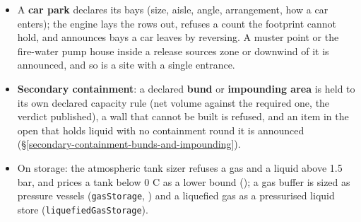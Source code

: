 \documentclass[11pt,a4paper]{article}
\begin{document}
\begin{itemize}
  Each road is carried on from its end to its gate\textquotesingle s
  opening in the fence.
\item
  A \textbf{car park} declares its bays (size, aisle, angle, arrangement,
  how a car enters); the engine lays the rows out, refuses a count the
  footprint cannot hold, and announces bays a car leaves by reversing.
  A muster point or the fire-water pump house inside a release
  source\textquotesingle s zone or downwind of it is announced, and so is
  a site with a single entrance.
\item
  \textbf{Secondary containment}: a declared \textbf{bund} or
  \textbf{impounding area} is held to its own declared capacity rule
  (net volume against the required one, the verdict published), a wall
  that cannot be built is refused, and an item in the open that holds
  liquid with no containment round it is announced
  (\S\ref{secondary-containment-bunds-and-impounding}).
\item
  On storage: the atmospheric tank sizer refuses a gas and a liquid above
  1.5 bar, and prices a tank below 0 \textdegree{}C as a lower bound
  (); a gas buffer is
  sized as pressure vessels (\texttt{gasStorage},
  ) and a liquefied gas
  as a pressurised liquid store (\texttt{liquefiedGasStorage}).
\end{itemize}
\end{document}
